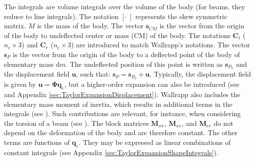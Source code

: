 \documentclass[wes, manuscript]{copernicus}
\renewcommand{\d}{\mathrm{d}}
\renewcommand{\v}[1]{\boldsymbol{#1}}
\newcommand{\m}[1]{\boldsymbol{#1}}
\newcommand{\M} {{\m{M}}}
\newcommand{\s}{\v{s}}
\renewcommand{\d}{\mathrm{d}}
\newcommand{\dm}{\d{m}}
\begin{document}
The integrals are volume integrals over the volume of the body (for beams, they reduce to line integrals).
    The notation $[\tilde{\ \ }]$ represents the skew symmetric matrix.
    $M$ is the mass of the body. 
The vector $\v{s}_{CM}$ is the vector from the origin of the body to undeflected center or mass (CM) of the body.
The notations $\m{C}_t$ ($n_e\times 3$) and $\m{C}_r$ ($n_e\times 3$) are introduced to match Wallrapp's notations.
The vector $\s_{P}$ is the vector from the origin of the body to a deflected point of the body of elementary mass $\dm$.
The undeflected position of this point is written as $\s_{P_0}$ and the displacement field $\v{u}$, such that:  $\s_{P}=\s_{P_0} + \v{u}$.
Typically, the displacement field is given by $\v{u}=\m{\Phi} \v{q}_e$, but a higher-order expansion can also be introduced (see \cite{Wallrapp:1994}  and Appendix \ref{sec:TaylorExpansionDisplacement}).
Wallrapp also includes the elementary mass moment of inertia, which results in additional terms in the integrals (see \cite{Wallrapp:1994}).
Such contributions are relevant, for instance, when considering the torsion of a beam (see \cite{branlard:2019flex}).
The block matrices $\M_{xx}$, $\M_{xe}$, and $\M_{ee}$ do not depend on the deformation of the body and are therefore constant.
The other terms are functions of $\v{q}_e$.
They may be expressed as linear combinations of constant integrals (see Appendix \ref{sec:TaylorExpansionShapeIntegrals}).
\end{document}
